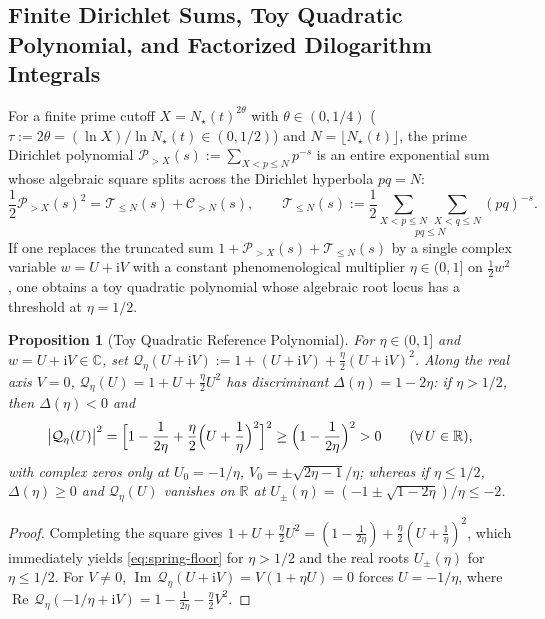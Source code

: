 \documentclass[11pt,reqno]{amsart}
\newtheorem{proposition}[theorem]{Proposition}
\theoremstyle{definition}
\theoremstyle{remark}
\numberwithin{equation}{section}
\newcommand{\ii}{\mathrm{i}}
\newcommand{\RePt}{\operatorname{Re}}
\newcommand{\ImPt}{\operatorname{Im}}
\begin{document}
\subsection{Finite Dirichlet Sums, Toy Quadratic Polynomial, and Factorized Dilogarithm Integrals}\label{subsec:factorized-dilog}

For a finite prime cutoff $X = N_\star(t)^{2\theta}$ with $\theta \in (0,1/4)$ ($\tau := 2\theta = (\ln X)/\ln N_\star(t) \in (0,1/2)$) and $N = \lfloor N_\star(t) \rfloor$, the prime Dirichlet polynomial $\mathcal{P}_{>X}(s) := \sum_{X < p \le N} p^{-s}$ is an entire exponential sum whose algebraic square splits across the Dirichlet hyperbola $pq = N$:
\begin{equation}\label{eq:P-square-def}
\frac{1}{2}\mathcal{P}_{>X}(s)^2 = \mathcal{T}_{\le N}(s) + \mathcal{C}_{>N}(s), \qquad \mathcal{T}_{\le N}(s) := \frac{1}{2}\underset{pq \le N}{\sum_{X < p \le N}\,\sum_{X < q \le N}} (pq)^{-s}.
\end{equation}
If one replaces the truncated sum $1 + \mathcal{P}_{>X}(s) + \mathcal{T}_{\le N}(s)$ by a single complex variable $w = U + \ii V$ with a constant phenomenological multiplier $\eta \in (0,1]$ on $\frac{1}{2}w^2$, one obtains a toy quadratic polynomial whose algebraic root locus has a threshold at $\eta = 1/2$.

\begin{proposition}[Toy Quadratic Reference Polynomial]\label{prop:toy-quadratic}
For $\eta \in (0,1]$ and $w = U + \ii V \in \mathbb{C}$, set $\mathcal{Q}_\eta(U+\ii V) := 1 + (U+\ii V) + \frac{\eta}{2}(U+\ii V)^2$. Along the real axis $V=0$, $\mathcal{Q}_\eta(U) = 1 + U + \frac{\eta}{2}U^2$ has discriminant $\Delta(\eta) = 1 - 2\eta$: if $\eta > 1/2$, then $\Delta(\eta) < 0$ and
\begin{equation}\label{eq:spring-floor}
\bigl|\mathcal{Q}_\eta(U)\bigr|^2 = \Bigl[1 - \frac{1}{2\eta} + \frac{\eta}{2}\Bigl(U + \frac{1}{\eta}\Bigr)^2\Bigr]^2 \ge \Bigl(1 - \frac{1}{2\eta}\Bigr)^2 > 0 \qquad (\forall\,U \in \mathbb{R}),
\end{equation}
with complex zeros only at $U_0 = -1/\eta$, $V_0 = \pm\sqrt{2\eta-1}/\eta$; whereas if $\eta \le 1/2$, $\Delta(\eta) \ge 0$ and $\mathcal{Q}_\eta(U)$ vanishes on $\mathbb{R}$ at $U_\pm(\eta) = (-1 \pm \sqrt{1-2\eta})/\eta \le -2$.
\end{proposition}

\begin{proof}
Completing the square gives $1 + U + \frac{\eta}{2}U^2 = (1 - \frac{1}{2\eta}) + \frac{\eta}{2}(U + \frac{1}{\eta})^2$, which immediately yields \eqref{eq:spring-floor} for $\eta > 1/2$ and the real roots $U_\pm(\eta)$ for $\eta \le 1/2$. For $V \ne 0$, $\ImPt\,\mathcal{Q}_\eta(U+\ii V) = V(1 + \eta U) = 0$ forces $U = -1/\eta$, where $\RePt\,\mathcal{Q}_\eta(-1/\eta + \ii V) = 1 - \frac{1}{2\eta} - \frac{\eta}{2}V^2$.
\end{proof}
\end{document}
